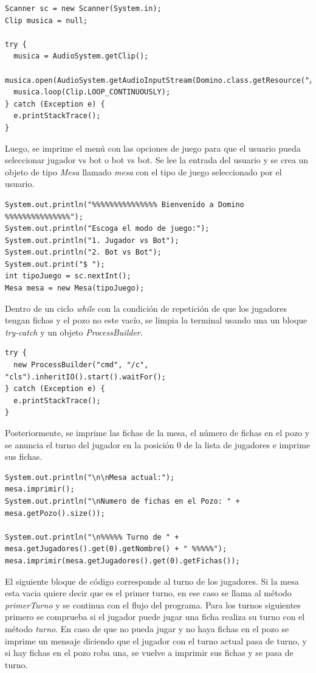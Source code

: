 \documentclass[12pt]{article}
\begin{document}
  \begin{lstlisting}
Scanner sc = new Scanner(System.in);
Clip musica = null;

try {
  musica = AudioSystem.getClip();
  musica.open(AudioSystem.getAudioInputStream(Domino.class.getResource("/recursos/MoonlightSonata.wav")));
  musica.loop(Clip.LOOP_CONTINUOUSLY); 
} catch (Exception e) {
  e.printStackTrace();
}
  \end{lstlisting}

  Luego, se imprime el menú con las opciones de juego para que el usuario pueda seleccionar jugador vs bot o bot vs bot. Se lee la entrada del usuario y se crea un objeto de tipo \textit{Mesa} llamado \textit{mesa} con el tipo de juego seleccionado por el usuario.

  \begin{lstlisting}
System.out.println("%%%%%%%%%%%%%%% Bienvenido a Domino %%%%%%%%%%%%%%%");
System.out.println("Escoga el modo de juego:");
System.out.println("1. Jugador vs Bot");
System.out.println("2. Bot vs Bot");
System.out.print("$ ");
int tipoJuego = sc.nextInt();
Mesa mesa = new Mesa(tipoJuego);
  \end{lstlisting}

  Dentro de un ciclo \textit{while} con la condición de repetición de que los jugadores tengan fichas y el pozo no este vacío, se limpia la terminal usando una un bloque \textit{try-catch} y un objeto \textit{ProcessBuilder}.

  \begin{lstlisting}
try {
  new ProcessBuilder("cmd", "/c", "cls").inheritIO().start().waitFor();
} catch (Exception e) {
  e.printStackTrace();
}
  \end{lstlisting}

  Posteriormente, se imprime las fichas de la mesa, el número de fichas en el pozo y se anuncia el turno del jugador en la posición 0 de la lista de jugadores e imprime sus fichas. 

  \begin{lstlisting}
System.out.println("\n\nMesa actual:");
mesa.imprimir();
System.out.println("\nNumero de fichas en el Pozo: " + mesa.getPozo().size());

System.out.println("\n%%%%% Turno de " + mesa.getJugadores().get(0).getNombre() + " %%%%%");
mesa.imprimir(mesa.getJugadores().get(0).getFichas());
  \end{lstlisting}
 
  El siguiente bloque de código corresponde al turno de los jugadores. Si la mesa esta vacia quiere decir que es el primer turno, en ese caso se llama al método \textit{primerTurno} y se continua con el flujo del programa. Para los turnos siguientes primero se comprueba si el jugador puede jugar una ficha realiza su turno con el método \textit{turno}. En caso de que no pueda jugar y no haya fichas en el pozo se imprime un mensaje diciendo que el jugador con el turno actual pasa de turno, y si hay fichas en el pozo roba una, se vuelve a imprimir sus fichas y se pasa de turno. 
\end{document}
